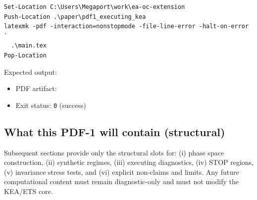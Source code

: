 \begin{verbatim}
Set-Location C:\Users\Megaport\work\ea-oc-extension
Push-Location .\paper\pdf1_executing_kea
latexmk -pdf -interaction=nonstopmode -file-line-error -halt-on-error `
  .\main.tex
Pop-Location
\end{verbatim}

Expected output:
\begin{itemize}
  \item PDF artifact: 
  \item Exit status: \texttt{0} (success)
\end{itemize}

\subsection{What this PDF-1 will contain (structural)}
Subsequent sections provide only the structural slots for:
(i) phase space construction, (ii) synthetic regimes, (iii) executing diagnostics,
(iv) STOP regions, (v) invariance stress tests, and (vi) explicit non-claims and limits.
Any future computational content must remain diagnostic-only and must not modify the KEA/ETS core.
